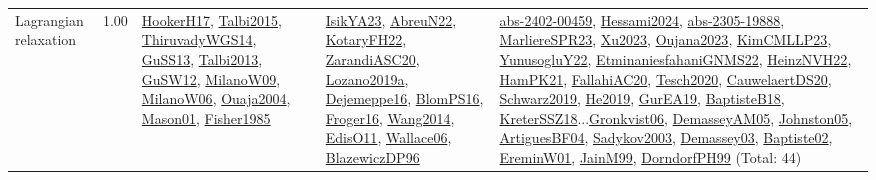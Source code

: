{\begin{longtable}{p{3cm}r>{\raggedright\arraybackslash}p{6cm}>{\raggedright\arraybackslash}p{6cm}>{\raggedright\arraybackslash}p{8cm}}
\index{Lagrangian relaxation}\index{Algorithms!Lagrangian relaxation}Lagrangian relaxation &  1.00 & \hyperref[detail:HookerH17]{HookerH17}, \hyperref[detail:Talbi2015]{Talbi2015}, \hyperref[detail:ThiruvadyWGS14]{ThiruvadyWGS14}, \hyperref[detail:GuSS13]{GuSS13}, \hyperref[detail:Talbi2013]{Talbi2013}, \hyperref[detail:GuSW12]{GuSW12}, \hyperref[detail:MilanoW09]{MilanoW09}, \hyperref[detail:MilanoW06]{MilanoW06}, \hyperref[detail:Ouaja2004]{Ouaja2004}, \hyperref[detail:Mason01]{Mason01}, \hyperref[detail:Fisher1985]{Fisher1985} & \hyperref[detail:IsikYA23]{IsikYA23}, \hyperref[detail:AbreuN22]{AbreuN22}, \hyperref[detail:KotaryFH22]{KotaryFH22}, \hyperref[detail:ZarandiASC20]{ZarandiASC20}, \hyperref[detail:Lozano2019a]{Lozano2019a}, \hyperref[detail:Dejemeppe16]{Dejemeppe16}, \hyperref[detail:BlomPS16]{BlomPS16}, \hyperref[detail:Froger16]{Froger16}, \hyperref[detail:Wang2014]{Wang2014}, \hyperref[detail:EdisO11]{EdisO11}, \hyperref[detail:Wallace06]{Wallace06}, \hyperref[detail:BlazewiczDP96]{BlazewiczDP96} & \hyperref[detail:abs-2402-00459]{abs-2402-00459}, \hyperref[detail:Hessami2024]{Hessami2024}, \hyperref[detail:abs-2305-19888]{abs-2305-19888}, \hyperref[detail:MarliereSPR23]{MarliereSPR23}, \hyperref[detail:Xu2023]{Xu2023}, \hyperref[detail:Oujana2023]{Oujana2023}, \hyperref[detail:KimCMLLP23]{KimCMLLP23}, \hyperref[detail:YunusogluY22]{YunusogluY22}, \hyperref[detail:EtminaniesfahaniGNMS22]{EtminaniesfahaniGNMS22}, \hyperref[detail:HeinzNVH22]{HeinzNVH22}, \hyperref[detail:HamPK21]{HamPK21}, \hyperref[detail:FallahiAC20]{FallahiAC20}, \hyperref[detail:Tesch2020]{Tesch2020}, \hyperref[detail:CauwelaertDS20]{CauwelaertDS20}, \hyperref[detail:Schwarz2019]{Schwarz2019}, \hyperref[detail:He2019]{He2019}, \hyperref[detail:GurEA19]{GurEA19}, \hyperref[detail:BaptisteB18]{BaptisteB18}, \hyperref[detail:KreterSSZ18]{KreterSSZ18}...\hyperref[detail:Gronkvist06]{Gronkvist06}, \hyperref[detail:DemasseyAM05]{DemasseyAM05}, \hyperref[detail:Johnston05]{Johnston05}, \hyperref[detail:ArtiguesBF04]{ArtiguesBF04}, \hyperref[detail:Sadykov2003]{Sadykov2003}, \hyperref[detail:Demassey03]{Demassey03}, \hyperref[detail:Baptiste02]{Baptiste02}, \hyperref[detail:EreminW01]{EreminW01}, \hyperref[detail:JainM99]{JainM99}, \hyperref[detail:DorndorfPH99]{DorndorfPH99} (Total: 44)\\

\end{longtable}}
